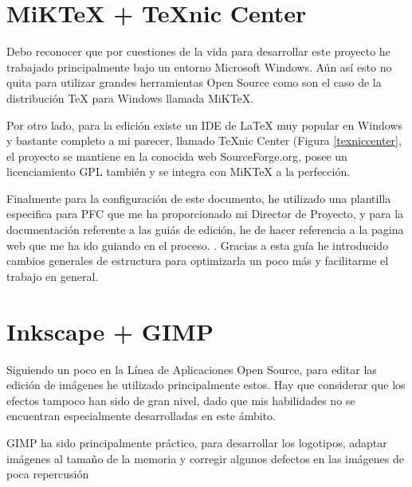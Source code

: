 
\section*{MiK\TeX{}  + \TeX nic Center}

Debo reconocer que por cuestiones de la vida para desarrollar este proyecto he trabajado principalmente bajo un entorno Microsoft Windows. Aún así esto no quita para utilizar grandes herramientas Open Source como son el caso de la distribución \TeX{} para Windows llamada MiK\TeX \cite{website:miktex}. 

Por otro lado, para la edición existe un IDE de \LaTeX{} muy popular en Windows y bastante completo a mi parecer, llamado \TeX nic Center (Figura \ref{texniccenter}, el proyecto se mantiene en la conocida web SourceForge.org, posee un licenciamiento GPL también y se integra con MiK\TeX{} a la perfección.

Finalmente para la configuración de este documento, he utilizado una plantilla especifica para PFC que me ha proporcionado mi Director de Proyecto, y para la documentación referente a las guiás de edición, he de hacer referencia a la pagina web que me ha ido guiando en el proceso. \cite{website:latex}. Gracias a esta guía he introducido cambios generales de estructura para optimizarla un poco más y facilitarme el trabajo en general.


\section*{Inkscape + GIMP}

Siguiendo un poco en la Línea de Aplicaciones Open Source, para editar las edición de imágenes he utilizado principalmente estos. Hay que considerar que los efectos tampoco han sido de gran nivel, dado que mis habilidades no se encuentran especialmente desarrolladas en este ámbito.

GIMP ha sido principalmente práctico, para desarrollar los logotipos, adaptar imágenes al tamaño de la memoria y corregir algunos defectos en las imágenes de poca repercusión

